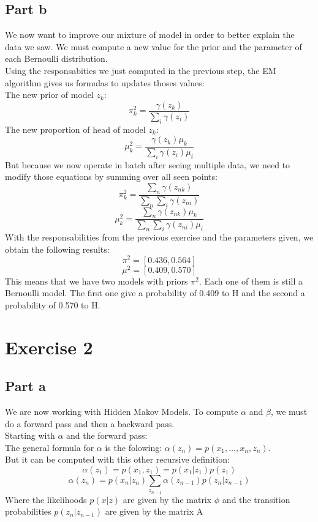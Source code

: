 \documentclass[a4paper, 10pt]{article}
\begin{document}
\subsection{Part b}
We now want to improve our mixture of model in order to better explain the data we saw.
We must compute a new value for the prior and the parameter of each Bernoulli distribution.
\\
Using the responsabities we just computed in the previous step, the EM algorithm gives us 
formulas to updates thoses values:
\\
The new prior of model $z_k$:
$$
\pi^2_k = \frac{\gamma(z_k)}{\sum_i \gamma(z_i)}
$$
The new proportion of head of model $z_k$:
$$
\mu^2_k = \frac{\gamma(z_k)\mu_k}{\sum_i \gamma(z_i)\mu_i}
$$
But because we now operate in batch after seeing multiple data, we need to modify
those equations by summing over all seen points:
$$
\pi^2_k = \frac{\sum_n\gamma(z_{nk})}{\sum_n \sum_i \gamma(z_{ni})}
$$
$$
\mu^2_k = \frac{\sum_n \gamma(z_{nk})\mu_k}{\sum_n \sum_i \gamma(z_{ni})\mu_i}
$$
With the responsabilities from the previous exercise and the parameters given,
we obtain the following results:
$$
\pi^2 = \left[0.436, 0.564\right]
$$
$$
\mu^2 = \left[0.409, 0.570\right]
$$
This means that we have two models with priors $\pi^2$. Each one of them is still a
Bernoulli model. The first one give a probability of 0.409 to H and the second a probability
of 0.570 to H.

\section{Exercise 2}
\subsection{Part a}
We are now working with Hidden Makov Models. To compute $\alpha$ and $\beta$,
we must do a forward pass and then a backward pass.
\\
Starting with $\alpha$ and the forward pass:
\\
The general formula for $\alpha$ is the folowing:
$\alpha(z_n) = p(x_1, \dots, x_n, z_n)$.
\\
But it can be computed with this other recursive definition:
$$
\alpha(z_1) = p(x_1, z_1) = p(x_1\vert z_1)p(z_1) 
$$
$$
\alpha(z_n) = p(x_n\vert z_n)\sum_{z_{n-1}} \alpha(z_{n-1})p(z_n\vert z_{n-1}) 
$$
Where the likelihoods $p(x\vert z)$ are given by the matrix $\phi$ and the 
transition probabilities $p(z_n \vert z_{n-1})$ are given by the matrix A
\end{document}
